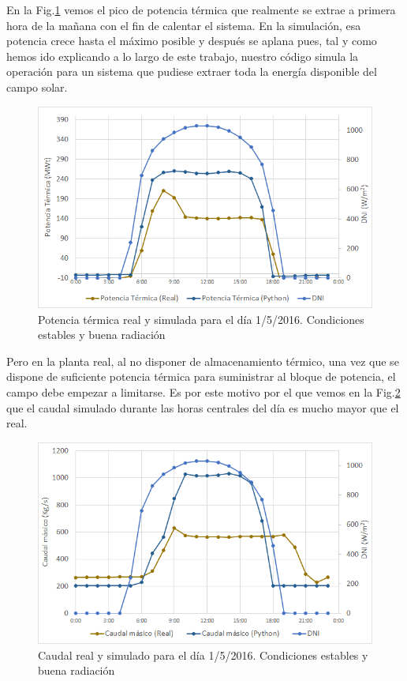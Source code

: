 En la  Fig.\ref{fig:potencia_1b} vemos el pico de potencia térmica que realmente se extrae a primera hora de la mañana con el fin de calentar el sistema. En la simulación, esa potencia crece hasta el máximo posible y después se aplana pues, tal y como hemos ido explicando a lo largo de este trabajo, nuestro código simula la operación para un sistema que pudiese extraer toda la energía disponible del campo solar. 

\begin{figure}[H]
\includegraphics[width=0.9\linewidth]{images/potencia_aste1b_01052016.png}
\caption[Potencia térmica real y simulada en un día de condiciones estables]{Potencia térmica real y simulada para el día 1/5/2016. Condiciones estables y buena radiación} 
\label{fig:potencia_1b}
\end{figure}

Pero en la planta real, al no disponer de almacenamiento térmico, una vez que se dispone de suficiente potencia térmica para suministrar al bloque de potencia, el campo debe empezar a limitarse. Es por este motivo por el que vemos en la Fig.\ref{fig:caudal_1b} que el caudal simulado durante las  horas centrales del día es mucho mayor que el real. 

\begin{figure}[H]
\includegraphics[width=0.9\linewidth]{images/caudal_aste1b_01052016.png}
\caption[Caudal real y simulado en un día de condiciones estables]{Caudal real y simulado para el día 1/5/2016. Condiciones estables y buena radiación} 
\label{fig:caudal_1b}
\end{figure}


